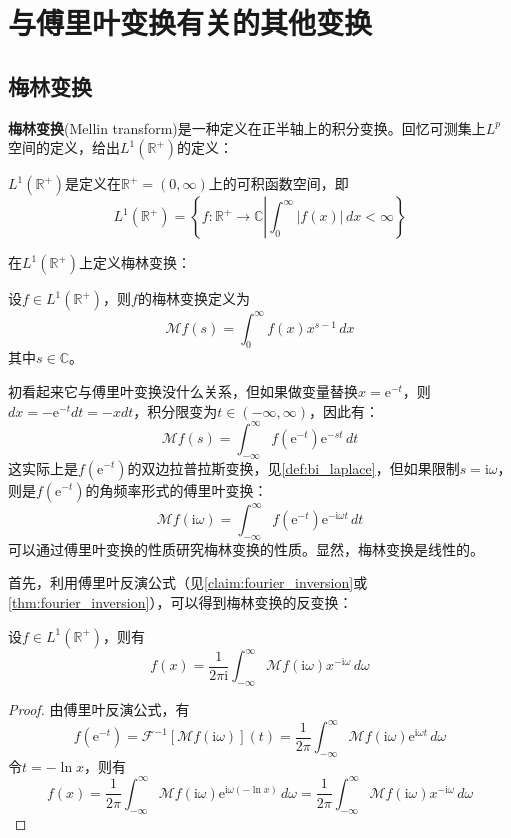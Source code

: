\section{与傅里叶变换有关的其他变换}\label{sec:Other_Transforms}

\subsection{梅林变换}\label{sub:mellin}

\textbf{梅林变换}(Mellin transform)是一种定义在正半轴上的积分变换。回忆可测集上$L^p$空间的定义，给出$L^1(\mathbb{R}^+)$的定义：
\begin{definition}
    $L^1(\mathbb{R}^+)$是定义在$\mathbb{R}^+=(0,\infty)$上的可积函数空间，即
    $$L^1(\mathbb{R}^+)=\left\{f:\mathbb{R}^+\to\mathbb{C}\left|\int_0^{\infty}|f(x)|\,dx<\infty\right.\right\}$$
\end{definition}

在$L^1(\mathbb{R}^+)$上定义梅林变换：

\begin{definition}[梅林变换]
    设$f\in L^1(\mathbb{R}^+)$，则$f$的梅林变换定义为
    \[\mathcal{M} f(s)=\int_0^{\infty}f(x)x^{s-1}\,dx\]
    其中$s\in\mathbb{C}$。    
\end{definition}

初看起来它与傅里叶变换没什么关系，但如果做变量替换$x=\mathrm{e}^{-t}$，则$dx=-\mathrm{e}^{-t}dt=-x dt$，积分限变为$t\in(-\infty,\infty)$，因此有：
\[\mathcal{M} f(s)=\int_{-\infty}^{\infty}f(\mathrm{e}^{-t})\mathrm{e}^{-s t}\,dt\]
这实际上是$f(\mathrm{e}^{-t})$的双边拉普拉斯变换，见\cref{def:bi_laplace}，但如果限制$s=\mathrm{i}\omega$，则是$f(\mathrm{e}^{-t})$的角频率形式的傅里叶变换：
\[\mathcal{M} f(\mathrm{i}\omega)=\int_{-\infty}^{\infty}f(\mathrm{e}^{-t})\mathrm{e}^{-\mathrm{i}\omega t}\,dt\]
可以通过傅里叶变换的性质研究梅林变换的性质。显然，梅林变换是线性的。

首先，利用傅里叶反演公式（见\cref{claim:fourier_inversion}或\cref{thm:fourier_inversion}），可以得到梅林变换的反变换：
\begin{proposition}[梅林反变换]
    设$f\in L^1(\mathbb{R}^+)$，则有
    \[f(x)=\frac{1}{2\pi \mathrm{i}}\int_{-\infty}^{\infty}\mathcal{M} f(\mathrm{i}\omega)x^{-\mathrm{i}\omega}\,d\omega\]
\end{proposition}
\begin{proof}
    由傅里叶反演公式，有
    \[f(\mathrm{e}^{-t})=\mathcal{F} ^{-1}[\mathcal{M} f(\mathrm{i}\omega)](t)=\frac{1}{2\pi}\int_{-\infty}^{\infty}\mathcal{M} f(\mathrm{i}\omega)\mathrm{e}^{\mathrm{i}\omega t}\,d\omega\]
    令$t=-\ln x$，则有
    \[f(x)=\frac{1}{2\pi}\int_{-\infty}^{\infty}\mathcal{M} f(\mathrm{i}\omega)\mathrm{e}^{\mathrm{i}\omega (-\ln x)}\,d\omega=\frac{1}{2\pi}\int_{-\infty}^{\infty}\mathcal{M} f(\mathrm{i}\omega)x^{-\mathrm{i}\omega}\,d\omega\]
\end{proof}


